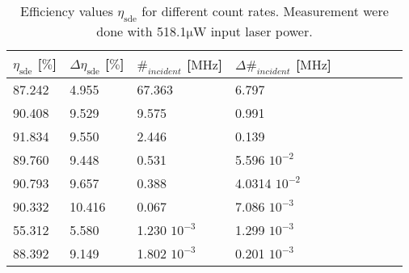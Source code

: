 
\begin{table}[!hbt]
    \centering
    \begin{tabular}{|l|l|l|l|l|l|l|l|l|}
    \hline
         $\eta_{\text{sde}} $ [$\%$] &  $ \Delta \eta_{\text{sde}} $ [$\%$] & $ \#_{incident} $ [$\si{\mega \Hz}$]
    & $ \Delta \#_{incident} $ [$\si{\mega \Hz}$] \\ \hline
        87.242 & 4.955  & 67.363   & 6.797\\ \hline
        90.408 & 9.529  & 9.575            & 0.991\\ \hline
        91.834 & 9.550  & 2.446            & 0.139\\ \hline
        89.760 & 9.448  & 0.531  & 5.596  $10^{-2}$\\ \hline
        90.793 & 9.657  & 0.388  & 4.0314 $10^{-2}$\\ \hline
        90.332 & 10.416 & 0.067  & 7.086 $10^{-3}$\\ \hline
        55.312 & 5.580  & 1.230 $10^{-3}$   & 1.299 $10^{-3}$\\ \hline
        88.392 & 9.149  & 1.802 $10^{-3}$  & 0.201 $10^{-3}$\\ \hline
    \end{tabular}
    \caption{ Efficiency values $\eta_{\text{sde}}$ for different count rates.
    Measurement were done with 518.1$ \si{\micro \W}$ input laser power.}
    \label{tab:sde_count_rate_table}
\end{table}